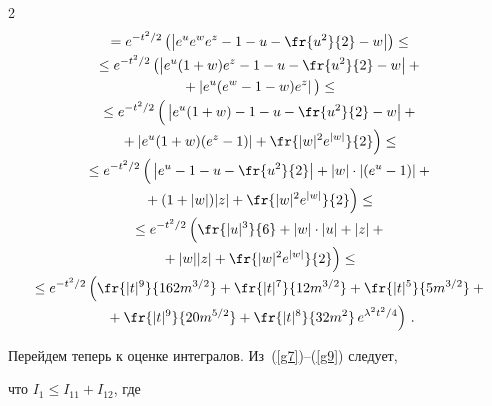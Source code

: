 \begin{multicols}{2}
\begin{multline}
{}=  e^{-t^2/2}\left(\left|e^u e^w e^z- 1 - u - \fr{u^2}{2} - w \right|\right)\leq{}\\[-1pt]


{} \leq e^{-t^2/2}\left(


\left|e^u (1+w) e^z- 1 - u - \fr{u^2}{2} - w \right| +{} \right.\\[-1pt]


\left.{} + \left|e^u(e^w - 1 -w)e^z\right| \vphantom{\fr{u^2}{2}}\right)\leq{}\\[-1pt]


{} \leq  e^{-t^2/2}\left(


\vphantom{\fr{|w|^2 e^{|w|}}{2}}\left|e^u(1+w) - 1 - u - \fr{u^2}{2} - w \right| + {}\right.\\[-1pt]


\left.{} + \left|e^u (1 + w)(e^z -1)\right|  +\fr{|w|^2e^{|w|}}{2}


\right)\leq{}\\[-1pt]


{} \leq  e^{-t^2/2}\left( 


\vphantom{\fr{|w|^2 e^{|w|}}{2}}


\left| e^u -1 - u - \fr{u^2}{2}\right| + |w|\cdot |(e^u - 1)| +{} \right.\\[-1pt]


\left.{} + (1+|w|)|z| + \fr{|w|^2 e^{|w|}}{2}\right)\leq{}\\[-1pt]


{} \leq  e^{-t^2/2}\left( \vphantom{\fr{|u|^3 e^{|w|}}{6}}


\fr{|u|^3}{6}+|w|\cdot |u|+ |z| +{}\right.\\[-1pt]


\left.{}+ |w||z| +\fr{|w|^2 e^{|w|}}{2}\right)\leq{}\\[-1pt]


{} \leq  e^{-t^2/2}\left(\fr{|t|^9}{162m^{3/2}}+\fr{|t|^7}{12m^{3/2}}+\fr{ |t|^5}{5m^{3/2}}+{}\right.\\[-1pt]


\left.{} + \fr{ |t|^9}{20m^{5/2}}+\fr{|t|^8}{32m^2}\, e^{\lambda^2 t^2 /4}\right)\,.


\label{g9}


\end{multline}


Перейдем теперь к оценке интегралов. Из~(\ref{g7})--(\ref{g9}) следует, 


что $I_1 \leq I_{11} +I_{12}$, где






\end{multicols}
